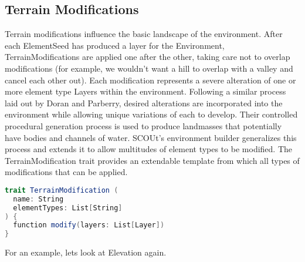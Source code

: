 \subsection{Terrain Modifications}
Terrain modifications influence the basic landscape of the environment.
After each ElementSeed has produced a layer for the Environment, TerrainModifications are applied one after the other, taking care not to overlap modifications (for example, we wouldn't want a hill to overlap with a valley and cancel each other out).
Each modification represents a severe alteration of one or more element type Layers within the environment.
Following a similar process laid out by Doran and Parberry\cite{doran_controlled_2010}, desired alterations are incorporated into the environment while allowing unique variations of each to develop.
Their controlled procedural generation process is used to produce landmasses that potentially have bodies and channels of water.
SCOUt's environment builder generalizes this process and extends it to allow multitudes of element types to be modified.
The TerrainModification trait provides an extendable template from which all types of modifications that can be applied.

\begin{lstlisting}[language=Scala]
trait TerrainModification (
  name: String
  elementTypes: List[String]
) {
  function modify(layers: List[Layer])
}
\end{lstlisting}


For an example, lets look at Elevation again.

